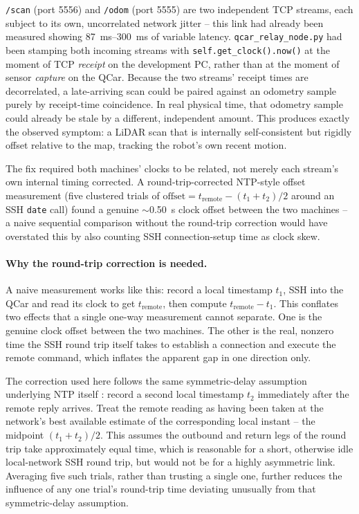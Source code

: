 \texttt{/scan} (port 5556) and \texttt{/odom} (port 5555) are two
independent TCP streams, each subject to its own, uncorrelated
network jitter -- this link had already been measured showing
\SIrange{87}{300}{\milli\second} of variable latency.
\texttt{qcar\_relay\_node.py} had been stamping both incoming
streams with \texttt{self.get\_clock().now()} at the moment of TCP
\emph{receipt} on the development PC, rather than at the moment of
sensor \emph{capture} on the QCar. Because the two streams' receipt
times are decorrelated, a late-arriving scan could be paired against
an odometry sample purely by receipt-time coincidence. In real
physical time, that odometry sample could already be stale by a
different, independent amount. This produces exactly the observed symptom: a
LiDAR scan that is internally self-consistent but rigidly offset
relative to the map, tracking the robot's own recent motion.

The fix required both machines' clocks to be related, not merely
each stream's own internal timing corrected. A round-trip-corrected
NTP-style offset measurement (five clustered trials of
$\text{offset} = t_{\text{remote}} - (t_1+t_2)/2$ around an SSH
\texttt{date} call) found a genuine $\sim$\SI{0.50}{\second} clock
offset between the two machines -- a naive sequential comparison
without the round-trip correction would have overstated this by also
counting SSH connection-setup time as clock skew.

\paragraph{Why the round-trip correction is needed.}
A naive measurement works like this: record a local timestamp $t_1$,
SSH into the QCar and read its clock to get $t_{\text{remote}}$, then
compute $t_{\text{remote}} - t_1$. This conflates two effects that a
single one-way measurement cannot separate. One is the genuine clock offset
between the two machines. The other is the real, nonzero time the
SSH round trip itself takes to establish a connection and execute
the remote command, which inflates the apparent gap in one direction
only.

The correction used here follows the same symmetric-delay assumption
underlying NTP itself \cite{rfc5905ntp}: record a second local timestamp $t_2$
immediately after the remote reply arrives. Treat the remote
reading as having been taken at the network's best available
estimate of the corresponding local instant -- the midpoint
$(t_1+t_2)/2$. This assumes the outbound and return legs of the
round trip take approximately equal time, which is reasonable for a
short, otherwise idle local-network SSH round trip, but would not be
for a highly asymmetric link. Averaging five such trials, rather
than trusting a single one, further reduces the influence of any one
trial's round-trip time deviating unusually from that
symmetric-delay assumption.


